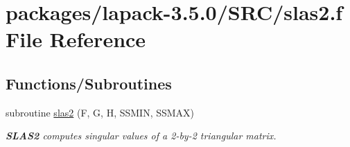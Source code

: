 \hypertarget{slas2_8f}{}\section{packages/lapack-\/3.5.0/\+S\+R\+C/slas2.f File Reference}
\label{slas2_8f}
\subsection*{Functions/\+Subroutines}
\begin{DoxyCompactItemize}
\item 
subroutine \hyperlink{group__auxOTHERauxiliary_ga7047efd8096db5f0724f79cad80e4127}{slas2} (F, G, H, S\+S\+M\+I\+N, S\+S\+M\+A\+X)
\begin{DoxyCompactList}\small\item\em {\bfseries S\+L\+A\+S2} computes singular values of a 2-\/by-\/2 triangular matrix. \end{DoxyCompactList}\end{DoxyCompactItemize}
